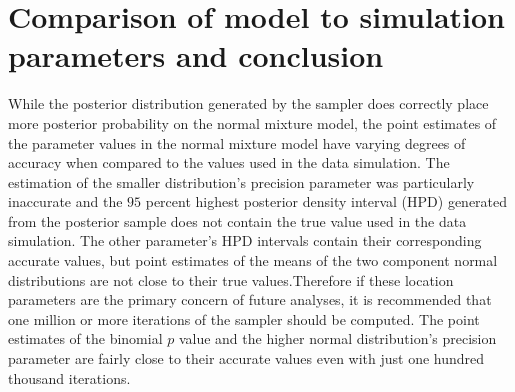 \documentclass[12pt]{article}
\begin{document}
\section*{Comparison of model to simulation parameters and conclusion}

While the posterior distribution generated by the sampler does correctly place more posterior probability on the normal mixture model, the point estimates of the parameter values in the normal mixture model have varying degrees of accuracy when compared to the values used in the data simulation. The estimation of the smaller distribution's precision parameter was particularly inaccurate and the $95$ percent highest posterior density interval (HPD) generated from the posterior sample does not contain the true value used in the data simulation. The other parameter's HPD intervals contain their corresponding accurate values, but point estimates of the means of the two component normal distributions are not  close to their true values.Therefore if these location parameters are the primary concern of future analyses, it is recommended that one million or more iterations of the sampler should be computed. The point estimates of the binomial $p$ value and the higher normal distribution's precision parameter are fairly close to their accurate values even with just one hundred thousand iterations. 
\end{document}
